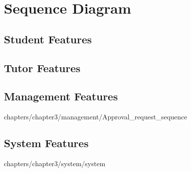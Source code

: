 \section{Sequence Diagram}

\subsection{Student Features}

   


\subsection {Tutor Features}




\subsection{Management Features}
 {chapters/chapter3/management/Approval_request_sequence}


\subsection{System Features}
 {chapters/chapter3/system/system}

